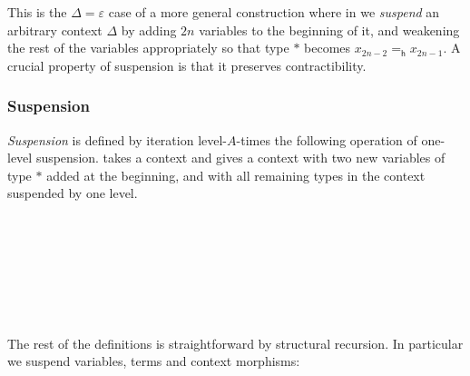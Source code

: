 This is the $\Delta = \varepsilon$ case of a more general construction
where in we \emph{suspend} an arbitrary context $\Delta$ by adding $2n$
variables to the beginning of it, and weakening the rest of the
variables appropriately so that type $*$ becomes $x_{2n-2} =_\mathsf{h}
x_{2n-1}$. A crucial property of suspension is that it preserves
contractibility. 


\subsubsection{Suspension}
\label{sec:susp}

\emph{Suspension} is defined by iteration level-$A$-times the following
operation of one-level suspension.  takes a
context and gives a context with two new variables of type $*$ added
at the beginning, and with all remaining types in the context suspended
by one level. 

\begin{code}\>\<%
\\
\> \AgdaSymbol{:}   \<%
\\
\> \AgdaSymbol{:} \AgdaSymbol{\}}      \AgdaSymbol{(} \AgdaSymbol{)}\<%
\\
%
\\
\>  \<[12]%
\>[12]\AgdaSymbol{=}  \AgdaInductiveConstructor{,} \AgdaInductiveConstructor{*} \AgdaInductiveConstructor{,} \AgdaInductiveConstructor{*}\<%
\\
\> \AgdaSymbol{(} \AgdaInductiveConstructor{,} \AgdaSymbol{)} \<[12]%
\>[12]\AgdaSymbol{=}   \AgdaInductiveConstructor{,}  \<%
\\
\>\<\end{code}
\noindent The rest of the definitions is straightforward by structural
recursion. In particular we suspend variables, terms and context morphisms:

